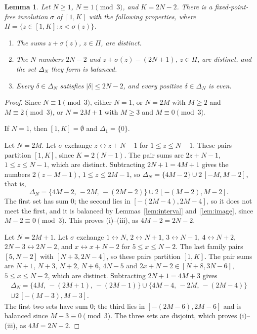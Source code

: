 \documentclass[preprint,12pt]{elsarticle}
\newtheorem{lemma}[theorem]{Lemma}
\theoremstyle{definition}
\newcommand{\iv}[2]{[#1,#2]}
\begin{document}
\begin{lemma}\label{lem:sigma}
Let $N\ge1$, $N\equiv1\pmod3$, and $K=2N-2$. There is a fixed-point-free involution $\sigma$ of $\iv1K$ with the following properties, where $\Pi=\{z\in\iv1K:z<\sigma(z)\}$.
\begin{enumerate}
\item[(i)] The sums $z+\sigma(z)$, $z\in\Pi$, are distinct.
\item[(ii)] The $N$ numbers $2N-2$ and $z+\sigma(z)-(2N+1)$, $z\in\Pi$, are distinct, and the set $\Delta_N$ they form is balanced.
\item[(iii)] Every $\delta\in\Delta_N$ satisfies $|\delta|\le 2N-2$, and every positive $\delta\in\Delta_N$ is even.
\end{enumerate}
\end{lemma}

\begin{proof}
Since $N\equiv1\pmod3$, either $N=1$, or $N=2M$ with $M\ge2$ and $M\equiv2\pmod3$, or $N=2M+1$ with $M\ge3$ and $M\equiv0\pmod3$.

If $N=1$, then $\iv1K=\emptyset$ and $\Delta_1=\{0\}$.

Let $N=2M$. Let $\sigma$ exchange $z\leftrightarrow z+N-1$ for $1\le z\le N-1$. These pairs partition $\iv1K$, since $K=2(N-1)$. The pair sums are $2z+N-1$, $1\le z\le N-1$, which are distinct. Subtracting $2N+1=4M+1$ gives the numbers $2(z-M-1)$, $1\le z\le 2M-1$, so $\Delta_N=\{4M-2\}\cup2\,\iv{-M}{M-2}$, that is,
\[
\Delta_N=\{4M-2,\,-2M,\,-(2M-2)\}\cup 2\,\iv{-(M-2)}{M-2}.
\]
The first set has sum $0$; the second lies in $\iv{-(2M-4)}{2M-4}$, so it does not meet the first, and it is balanced by Lemmas~\ref{lem:interval} and~\ref{lem:image}, since $M-2\equiv0\pmod3$. This proves (i)--(iii), as $4M-2=2N-2$.

Let $N=2M+1$. Let $\sigma$ exchange $1\leftrightarrow N$, $2\leftrightarrow N+1$, $3\leftrightarrow N-1$, $4\leftrightarrow N+2$, $2N-3\leftrightarrow2N-2$, and $x\leftrightarrow x+N-2$ for $5\le x\le N-2$. The last family pairs $\iv5{N-2}$ with $\iv{N+3}{2N-4}$, so these pairs partition $\iv1K$. The pair sums are $N+1$, $N+3$, $N+2$, $N+6$, $4N-5$ and $2x+N-2\in\iv{N+8}{3N-6}$, $5\le x\le N-2$, which are distinct. Subtracting $2N+1=4M+3$ gives
\begin{multline*}
\Delta_N=\{4M,\,-(2M+1),\,-(2M-1)\}\cup\{4M-4,\,-2M,\,-(2M-4)\}\\
\cup 2\,\iv{-(M-3)}{M-3}.
\end{multline*}
The first two sets have sum $0$; the third lies in $\iv{-(2M-6)}{2M-6}$ and is balanced since $M-3\equiv0\pmod3$. The three sets are disjoint, which proves (i)--(iii), as $4M=2N-2$.
\end{proof}
\end{document}
